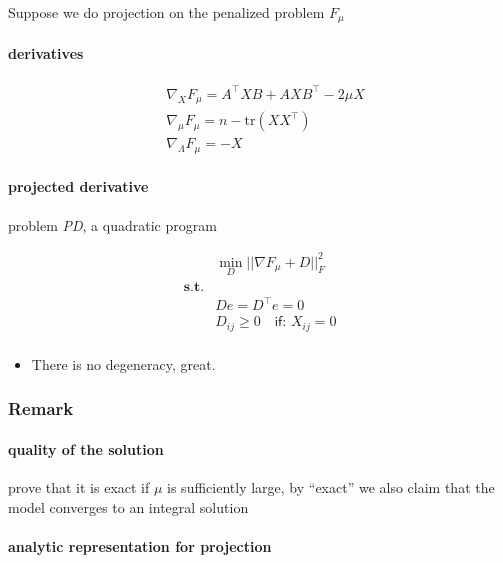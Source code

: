 \documentclass[
  10pt,
  a4paper,
,tablecaptionabove
]{scrartcl}
\providecommand{\tightlist}{%
  \setlength{\itemsep}{0pt}\setlength{\parskip}{0pt}}
\begin{document}
Suppose we do projection on the penalized problem \(F_\mu\)

\hypertarget{derivatives}{%
\paragraph{derivatives}\label{derivatives}}

\[\begin{aligned}
& \nabla_X F_\mu  = A^\top XB + AXB^\top - 2\mu X \\
& \nabla_\mu F_\mu  = n - \textrm{tr}(XX^\top) \\
& \nabla_\Lambda F_\mu  = - X
\end{aligned}\]

\hypertarget{projected-derivative}{%
\paragraph{projected derivative}\label{projected-derivative}}

problem \emph{PD}, a quadratic program

\[\begin{aligned}
&\min_D ||\nabla F_\mu + D ||_F^2  \\
\mathbf{s.t.} & \\
&D e = D^\top e = 0 \\ 
&D_{ij} \ge 0 \quad \textsf{if: } X_{ij} = 0\\
\end{aligned}\]

\begin{itemize}
\tightlist
\item
  There is no degeneracy, great.
\end{itemize}

\hypertarget{remark}{%
\subsubsection{Remark}\label{remark}}

\hypertarget{quality-of-the-solution}{%
\paragraph{quality of the solution}\label{quality-of-the-solution}}

prove that it is exact if \(\mu\) is sufficiently large, by ``exact'' we
also claim that the model converges to an integral solution

\hypertarget{analytic-representation-for-projection}{%
\paragraph{analytic representation for
projection}\label{analytic-representation-for-projection}}
\end{document}
